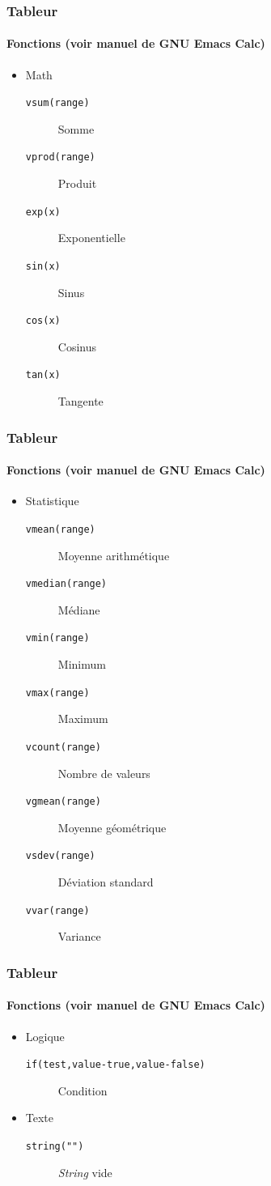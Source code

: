 \documentclass[presentation,t,hideothersubsections]{beamer}
\begin{document}
\begin{frame}
\frametitle{Tableur}
\framesubtitle{Fonctions (voir manuel de GNU Emacs Calc)}
\label{sec-3-3-9}


\begin{itemize}
\item Math
\begin{description}
\item[\texttt{vsum(range)}] Somme
\item[\texttt{vprod(range)}] Produit
\item[\texttt{exp(x)}] Exponentielle
\item[\texttt{sin(x)}] Sinus
\item[\texttt{cos(x)}] Cosinus
\item[\texttt{tan(x)}] Tangente
\end{description}
\end{itemize}
\end{frame}
\begin{frame}
\frametitle{Tableur}
\framesubtitle{Fonctions (voir manuel de GNU Emacs Calc)}
\label{sec-3-3-10}


\begin{itemize}
\item Statistique
\begin{description}
\item[\texttt{vmean(range)}] Moyenne arithmétique
\item[\texttt{vmedian(range)}] Médiane
\item[\texttt{vmin(range)}] Minimum
\item[\texttt{vmax(range)}] Maximum
\item[\texttt{vcount(range)}] Nombre de valeurs
\item[\texttt{vgmean(range)}] Moyenne géométrique
\item[\texttt{vsdev(range)}] Déviation standard
\item[\texttt{vvar(range)}] Variance
\end{description}
\end{itemize}
\end{frame}
\begin{frame}
\frametitle{Tableur}
\framesubtitle{Fonctions (voir manuel de GNU Emacs Calc)}
\label{sec-3-3-11}


\begin{itemize}
\item Logique
\begin{description}
\item[\texttt{if(test,value-true,value-false)}] Condition
\end{description}
\item Texte
\begin{description}
\item[\texttt{string("")}] \emph{String} vide
\end{description}
\end{itemize}
\end{frame}
\end{document}

